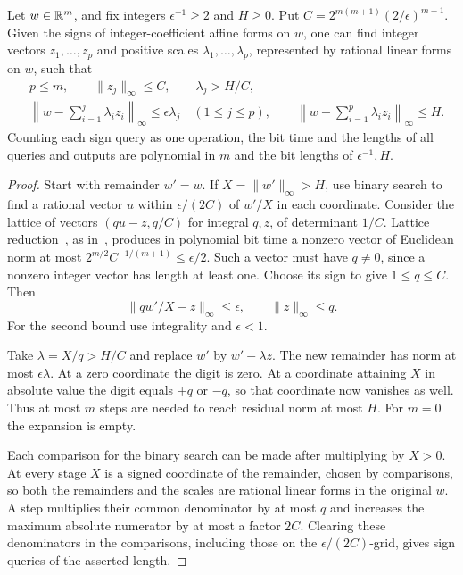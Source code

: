 \begin{lemma}\label{lem:peel}
Let \(w\in\mathbb R^m\), and fix integers \(\epsilon^{-1}\ge2\) and
\(H\ge0\). Put \(C=2^{m(m+1)}(2/\epsilon)^{m+1}\).
Given the signs of integer-coefficient affine forms on \(w\), one
can find integer vectors \(z_1,\ldots,z_p\) and positive scales
\(\lambda_1,\ldots,\lambda_p\), represented by rational linear forms
on \(w\), such that
\[
 \begin{aligned}
 &p\le m,\qquad \|z_j\|_\infty\le C,\qquad \lambda_j>H/C,\\
 &\left\|w-\sum_{i=1}^j\lambda_i z_i\right\|_\infty\le\epsilon\lambda_j
       \quad (1\le j\le p),\qquad
   \left\|w-\sum_{i=1}^p\lambda_i z_i\right\|_\infty\le H .
 \end{aligned}
\]
Counting each sign query as one operation, the bit time and the
lengths of all queries and outputs are polynomial in \(m\) and the
bit lengths of \(\epsilon^{-1},H\).
\end{lemma}
\begin{proof}
Start with remainder \(w'=w\). If \(X=\|w'\|_\infty>H\), use binary
search to find a rational vector \(u\) within \(\epsilon/(2C)\) of
\(w'/X\) in each coordinate. Consider the lattice of vectors
\((qu-z,q/C)\) for integral \(q,z\), of determinant \(1/C\).
Lattice reduction~\cite{LLL}, as in~\cite[Theorem~(5.3.19)]{GLS},
produces in polynomial bit time a nonzero vector of Euclidean norm
at most \(2^{m/2}C^{-1/(m+1)}\le\epsilon/2\). Such a vector must
have \(q\ne0\), since a nonzero integer vector has length at least
one. Choose its sign to give \(1\le q\le C\). Then
\[
 \|q w'/X-z\|_\infty\le\epsilon ,\qquad \|z\|_\infty\le q.
\]
For the second bound use integrality and \(\epsilon<1\).

Take \(\lambda=X/q>H/C\) and replace \(w'\) by \(w'-\lambda z\).
The new remainder has norm at most \(\epsilon\lambda\). At a zero
coordinate the digit is zero. At a coordinate attaining \(X\) in
absolute value the digit equals \(+q\) or \(-q\), so that coordinate
now vanishes as well. Thus at most \(m\) steps are needed to reach
residual norm at most \(H\). For \(m=0\) the expansion is empty.

Each comparison for the binary search can be made after multiplying
by \(X>0\). At every stage \(X\) is a signed coordinate of the
remainder, chosen by comparisons, so both the remainders and the
scales are rational linear forms in the original \(w\). A step
multiplies their common denominator by at most \(q\) and increases
the maximum absolute numerator by at most a factor \(2C\). Clearing
these denominators in the comparisons, including those on the
\(\epsilon/(2C)\)-grid, gives sign queries of the asserted length.
\end{proof}

